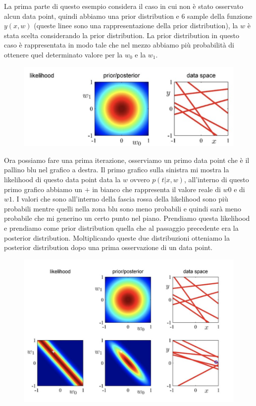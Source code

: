 \documentclass[14pt]{extreport}
\begin{document}
La prima parte di questo esempio considera il caso in cui non è stato osservato alcun data point, quindi abbiamo una prior distribution e 6 sample
della funzione $y(x,w)$ (queste linee sono una rappresentazione della prior distribution), la $w$ è stata scelta considerando la prior distribution.
La prior distribution in questo caso è rappresentata in modo tale che nel mezzo abbiamo più probabilità di ottenere quel determinato valore per la
$w_0$ e la $w_1$.

\begin{figure}[H]
	\centering
	\includegraphics[width=0.7\linewidth]{132.jpeg}
\end{figure}

Ora possiamo fare una prima iterazione, osserviamo un primo data point che è il pallino blu nel grafico a destra. Il primo grafico sulla sinistra mi
mostra la likelihood di questo data point data la $w$ ovvero $p(t|x,w)$, all'interno di questo primo grafico abbiamo un $+$ in bianco che rappresenta
il valore reale di $w0$ e di $w1$. I valori che sono all'interno della fascia rossa della likelihood sono più probabili mentre quelli nella zona blu
sono meno probabili e quindi sarà meno probabile che mi generino un certo punto nel piano. Prendiamo questa likelihood e prendiamo come prior
distribution quella che al passaggio precedente era la posterior distribution. Moltiplicando queste due distribuzioni otteniamo la posterior
distribution dopo una prima osservazione di un data point.

\begin{figure}[H]
	\centering
	\includegraphics[width=0.7\linewidth]{133.jpeg}
\end{figure}
\end{document}
